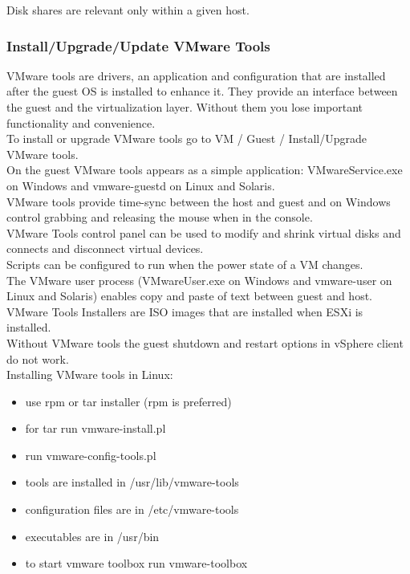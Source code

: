 Disk shares are relevant only within a given host.

\subsubsection{Install/Upgrade/Update VMware Tools}

VMware tools are drivers, an application and configuration that are installed
after the guest OS is installed to enhance it. They provide an interface
between the guest and the virtualization layer. Without them you lose
important functionality and convenience.\\

To install or upgrade VMware tools go to VM / Guest / Install/Upgrade VMware
tools.\\

On the guest VMware tools appears as a simple application: VMwareService.exe
on Windows and vmware-guestd on Linux and Solaris.\\

VMware tools provide time-sync between the host and guest and on Windows
control grabbing and releasing the mouse when in the console.\\

VMware Tools control panel can be used to modify and shrink virtual disks and
connects and disconnect virtual devices.\\

Scripts can be configured to run when the power state of a VM changes.\\

The VMware user process (VMwareUser.exe on Windows and vmware-user on Linux
and Solaris) enables copy and paste of text between guest and host.\\

VMware Tools Installers are ISO images that are installed when ESXi is
installed.\\

Without VMware tools the guest shutdown and restart options in vSphere client
do not work.\\

Installing VMware tools in Linux:

\begin{itemize}
\item use rpm or tar installer (rpm is preferred)
\item for tar run vmware-install.pl
\item run vmware-config-tools.pl
\item tools are installed in /usr/lib/vmware-tools
\item configuration files are in /etc/vmware-tools
\item executables are in /usr/bin
\item to start vmware toolbox run vmware-toolbox
\end{itemize}


